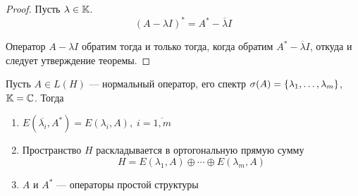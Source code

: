 \begin{proof}
    Пусть $\lambda \in \mathbb{K}$.
    \[ (A - \lambda I)^* = A^* - \overline{\lambda} I \]
    
    Оператор $A - \lambda I$ обратим тогда и только тогда, когда обратим $A^* -
    \overline{\lambda}I$, откуда и следует утверждение теоремы.
\end{proof}

\begin{theorem}
    Пусть $A \in L(H)$ — нормальный оператор, его спектр $\operatorname{\sigma}(A) = \left\{\lambda_1,
    \dotsc, \lambda_m\right\}$, $\mathbb{K} = \mathbb{C}$. Тогда
    \begin{enumerate}
        \item $E(\overline{\lambda_i}, A^*) = E(\lambda_i, A), \; i =
            \overline{1,m}$
        \item Пространство $H$ раскладывается в ортогональную прямую сумму
            \[ H = E(\lambda_1, A) \oplus \dotsb \oplus E(\lambda_m, A) \]
        \item $A$ и $A^*$ — операторы простой структуры
    \end{enumerate}
\end{theorem}

